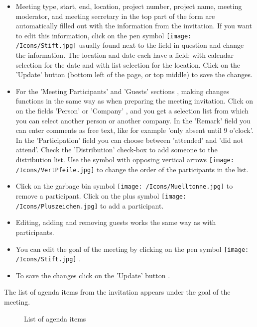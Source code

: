 \begin{itemize}
\item
Meeting type, start, end, location, project number, project name, meeting moderator, and meeting secretary in the top part of the form are automatically filled out with the information from the invitation. If you want to edit this information, click on the pen symbol \texttt{[image: /Icons/Stift.jpg]}  usually found next to the field in question and change the information. The location and date each have a field: with calendar selection for the date and with list selection for the location. Click on the 'Update' button  (bottom left of the page, or top middle) to save the changes.
\item
For the 'Meeting Participants' and 'Guests' sections , making changes functions in the same way as when preparing the meeting invitation. Click on on the fields 'Person'  or 'Company' , and you get a selection list from which you can select another person or another company. In the 'Remark' field  you can enter comments as free text, like for example 'only absent until 9 o’clock'. In the 'Participation' field  you can choose between 'attended' and 'did not attend'. Check the 'Distribution' check-box  to add someone to the distribution list. Use the symbol with opposing vertical arrows \texttt{[image: /Icons/VertPfeile.jpg]}  to change the order of the participants in the list.
\item
Click on the garbage bin symbol \texttt{[image: /Icons/Muelltonne.jpg]}  to remove a participant. Click on the plus symbol \texttt{[image: /Icons/Pluszeichen.jpg]}  to add a participant.
\item
Editing, adding and removing guests works the same way as with participants.
\item
You can edit the goal of the meeting by clicking on the pen symbol \texttt{[image: /Icons/Stift.jpg]} .
\item
To save the changes click on the 'Update' button .
\end{itemize}

The list of agenda items from the invitation appears under the goal of the meeting.

\begin{figure}[H]
\caption{List of agenda items}
\end{figure}

